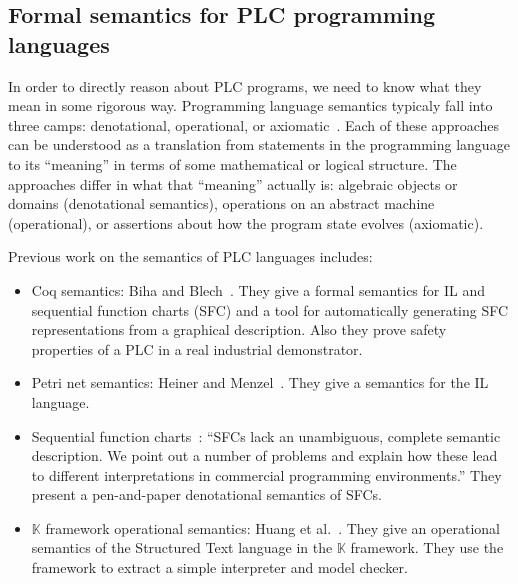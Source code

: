 \subsection{Formal semantics for PLC programming languages}

In order to directly reason about PLC programs, we need to know what they mean
in some rigorous way. Programming language semantics typicaly fall into three
camps: denotational, operational, or axiomatic~\cite{hoare:axiomatic}. Each of
these approaches can be understood as a translation from statements in the
programming language to its ``meaning'' in terms of some mathematical or logical
structure. The approaches differ in what that ``meaning'' actually is: algebraic
objects or domains (denotational semantics), operations on an abstract machine
(operational), or assertions about how the program state evolves (axiomatic).

Previous work on the semantics of PLC languages includes:

\begin{itemize}

\item Coq semantics: Biha and Blech~\cite{biha:plc_sem1, biha:plc_sem2,
biha:plc_sem3}. They give a formal semantics for IL and sequential function
charts (SFC) and a tool for automatically generating SFC representations from a
graphical description. Also they prove safety properties of a PLC in a real
industrial demonstrator.


\item Petri net semantics: Heiner and Menzel~\cite{heiner:petri}. They give a
semantics for the IL language.

\item Sequential function charts~\cite{bauer:unifying}: ``SFCs lack an
unambiguous, complete semantic description. We point out a number of problems
and explain how these lead to different interpretations in commercial
programming environments.'' They present a pen-and-paper denotational semantics
of SFCs.


\item $\mathbb{K}$ framework operational semantics: Huang et
al.~\cite{huang:kst}. They give an operational semantics of the Structured Text
language in the $\mathbb{K}$ framework. They use the framework to extract a
simple interpreter and model checker.


\end{itemize}

